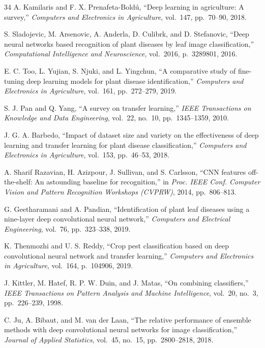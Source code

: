\documentclass[conference]{IEEEtran}
\begin{document}
\begin{thebibliography}{34}
A. Kamilaris and F. X. Prenafeta-Bold\'{u}, ``Deep learning in agriculture: A survey,'' \textit{Computers and Electronics in Agriculture}, vol.~147, pp.~70--90, 2018.

S. Sladojevic, M. Arsenovic, A. Anderla, D. Culibrk, and D. Stefanovic, ``Deep neural networks based recognition of plant diseases by leaf image classification,'' \textit{Computational Intelligence and Neuroscience}, vol.~2016, p.~3289801, 2016.

E. C. Too, L. Yujian, S. Njuki, and L. Yingchun, ``A comparative study of fine-tuning deep learning models for plant disease identification,'' \textit{Computers and Electronics in Agriculture}, vol.~161, pp.~272--279, 2019.

S. J. Pan and Q. Yang, ``A survey on transfer learning,'' \textit{IEEE Transactions on Knowledge and Data Engineering}, vol.~22, no.~10, pp.~1345--1359, 2010.

J. G. A. Barbedo, ``Impact of dataset size and variety on the effectiveness of deep learning and transfer learning for plant disease classification,'' \textit{Computers and Electronics in Agriculture}, vol.~153, pp.~46--53, 2018.

A. Sharif Razavian, H. Azizpour, J. Sullivan, and S. Carlsson, ``CNN features off-the-shelf: An astounding baseline for recognition,'' in \textit{Proc. IEEE Conf. Computer Vision and Pattern Recognition Workshops (CVPRW)}, 2014, pp.~806--813.

G. Geetharamani and A. Pandian, ``Identification of plant leaf diseases using a nine-layer deep convolutional neural network,'' \textit{Computers and Electrical Engineering}, vol.~76, pp.~323--338, 2019.

K. Thenmozhi and U. S. Reddy, ``Crop pest classification based on deep convolutional neural network and transfer learning,'' \textit{Computers and Electronics in Agriculture}, vol.~164, p.~104906, 2019.

J. Kittler, M. Hatef, R. P. W. Duin, and J. Matas, ``On combining classifiers,'' \textit{IEEE Transactions on Pattern Analysis and Machine Intelligence}, vol.~20, no.~3, pp.~226--239, 1998.

C. Ju, A. Bibaut, and M. van der Laan, ``The relative performance of ensemble methods with deep convolutional neural networks for image classification,'' \textit{Journal of Applied Statistics}, vol.~45, no.~15, pp.~2800--2818, 2018.


\end{thebibliography}
\end{document}
